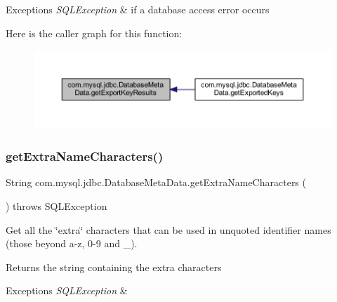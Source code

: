 \begin{DoxyExceptions}{Exceptions}
{\em S\+Q\+L\+Exception} & if a database access error occurs \\
\hline
\end{DoxyExceptions}
Here is the caller graph for this function\+:\nopagebreak
\begin{figure}[H]
\begin{center}
\leavevmode
\includegraphics[width=350pt]{classcom_1_1mysql_1_1jdbc_1_1_database_meta_data_a4b97c17b3d151680489b020f74b4299d_icgraph}
\end{center}
\end{figure}
\mbox{\label{classcom_1_1mysql_1_1jdbc_1_1_database_meta_data_a9502cc2c9909434a8f19ffdfd058ed2e}} 
\subsubsection{\texorpdfstring{get\+Extra\+Name\+Characters()}{getExtraNameCharacters()}}
{\footnotesize\ttfamily String com.\+mysql.\+jdbc.\+Database\+Meta\+Data.\+get\+Extra\+Name\+Characters (\begin{DoxyParamCaption}{ }\end{DoxyParamCaption}) throws S\+Q\+L\+Exception}

Get all the \char`\"{}extra\char`\"{} characters that can be used in unquoted identifier names (those beyond a-\/z, 0-\/9 and \+\_\+).

\begin{DoxyReturn}{Returns}
the string containing the extra characters 
\end{DoxyReturn}

\begin{DoxyExceptions}{Exceptions}
{\em S\+Q\+L\+Exception} & \\
\hline
\end{DoxyExceptions}
\mbox{\label{classcom_1_1mysql_1_1jdbc_1_1_database_meta_data_a83e22a1075216419f1fcd4d37b8b0fee}} 
